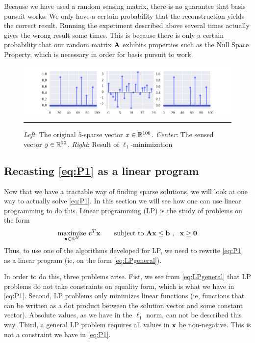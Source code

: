 Because we have used a random sensing matrix, there is no guarantee that basis pursuit works. We only have a certain probability that the reconstruction yields the correct result. Running the experiment described above several times actually gives the wrong result some times. This is because there is only a certain probability that our random matrix $ \mathbf{A} $ exhibits properties such as the Null Space Property, which is necessary in order for basis pursuit to work. 

\begin{figure}[bt]
	\centering
	\includegraphics[width=\textwidth]{figs/figure_1h.pdf}
	\caption{\textit{Left}: The original $ 5 $-sparse vector $ x \in \mathbb{R}^{100} $. \textit{Center}: The sensed vector $ y \in \mathbb{R}^{20} $. \textit{Right}: Result of $ \ell_{1} $-minimization}
	\label{fig:l1min}
	\vspace{4pt}\hrule
\end{figure}





\subsection{Recasting \eqref{eq:P1} as a linear program}
Now that we have a tractable way of finding sparse solutions, we will look at one way to actually solve \eqref{eq:P1}. In this section we will see how one can use linear programming to do this. Linear programming (LP) is the study of problems on the form
\begin{equation}
	\underset{\mathbf{x}\in\mathbb{K}^{N}}{\text{maximize}}~ \mathbf{c}^{T}\mathbf{x} \quad \quad\text{subject to}~ \mathbf{A}\mathbf{x}\leq\mathbf{b}~,~~ \mathbf{x}\geq\mathbf{0}
	\label{eq:LPgeneral}
\end{equation}
Thus, to use one of the algorithms developed for LP, we need to rewrite \eqref{eq:P1} as a linear program (ie, on the form \eqref{eq:LPgeneral}). 

In order to do this, three problems arise. Fist, we see from \cref{eq:LPgeneral} that LP problems do not take constraints on equality form, which is what we have in \eqref{eq:P1}. Second, LP problems only minimizes linear functions (ie, functions that can be written as a dot product between the solution vector and some constant vector). Absolute values, as we have in the $ \ell_{1} $ norm, can not be described this way. Third, a general LP problem requires all values in $ \mathbf{x} $ be non-negative. This is not a constraint we have in \eqref{eq:P1}.

